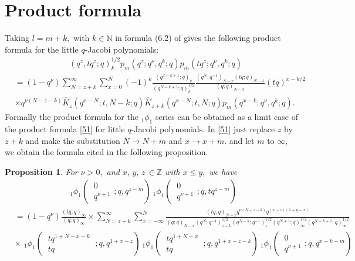 \documentclass[12pt,a4paper]{amsart}
\numberwithin{equation}{section}
\theoremstyle{plain}
\newtheorem{proposition}[theorem]{Proposition}
\theoremstyle{definition}
\theoremstyle{remark}
\numberwithin{equation}{section}
\numberwithin{table}{section}
\numberwithin{figure}{section}
\begin{document}
\section{Product formula}Taking $l=m+k,$ with $k \in \mathbb{N}$ in formula (6.2)
of \cite{FlorisKo} gives the following product formula for the
little $q$-Jacobi polynomials:
\begin{align}
&(q^z,tq^z;q)_{k}^{1/2}p_{m}(q^z;q^{\nu},q^{k};q)p_{m}(tq^z;q^{\nu},q^{k};q) \label{51}
\end{align}
\begin{align*}&=
(1-q^{\nu})\sum_{N=z+k}^{\infty}\sum_{x=0}^{N}(-1)^{k}\frac{(q^{x-k+1};q)_{k}}{(q^{N-k+1};q)_{k}^{1/2}}
\frac{(q^N;q^{-1})_{N-x}(tq;q)_{N-x}}{(q;q)_{N-x}} (tq)^{x-k/2}\\&
\times q^{\nu(N-z-k)}
 \widehat{K}_{z}\left(
q^{x-N};t,N-k;q\right)\widehat{K}_{z+k}\left(
q^{x-N};t,N;q\right)p_{m}(q^{x-k};q^{\nu},q^{k};q).
\end{align*}
Formally the product formula for the $_{1}\phi_{1}$ series can be
obtained as a limit case of the  product formula \eqref{51} for
little $q$-Jacobi polynomials. In \eqref{51} just replace $z$ by
$z+k$ and make the substitution $N\rightarrow N+m$ and $x\rightarrow
x+m$. and let $m$ to $\infty,$ we obtain the formula cited in the
following proposition.
\begin{proposition} For $\nu >0,$ and $x,\,y,\,z\,\in \mathbb{Z}$ with $x\leq y,$ we
have
\begin{align}
\ _{1}\phi_1\left(\begin{matrix} \ 0\  \\
\ q^{\nu+1}\end{matrix};q,q^{z-m}\right)\ _{1}\phi_1\left(\begin{matrix} \ 0\  \\
\ q^{\nu+1}\end{matrix};q,tq^{z-m}\right)\label{prod}
\end{align}
\begin{align*}&=(1-q^{\nu})
\frac{(tq;q)_{\infty}}{(q;q)_{\infty}}
\times \sum_{N=z+k}^{\infty}\sum_{x=-\infty
}^{N}\frac{(tq;q)_{N-x}
q^{\nu(N-z-k)}q^{(x-z)(1+y-x)}}{(q;q)_{N-x}(q^{N};q^{-1})_{z+k}^{1/2}(q^{N-k};q^{-1})_{z}^{1/2}(q^{N+1};q)_{\infty}^{1/2}(q^{N-k+1};q)_{\infty}^{1/2}}\\&\times
\,\ _{1}\phi_1\left(\begin{matrix} \ tq^{1+N-x-k}\  \\
\ tq\end{matrix};q,q^{1+x-z}\right)
\ _{1}\phi_1\left(\begin{matrix} \ tq^{1+N-x}\  \\
\ tq\end{matrix};q,q^{1+x-z-k}\right)\ _{1}\phi_1\left(\begin{matrix} \ 0\  \\
\ q^{\nu+1}\end{matrix};q,q^{x-k-m}\right)
\end{align*}
\end{proposition}
\end{document}
